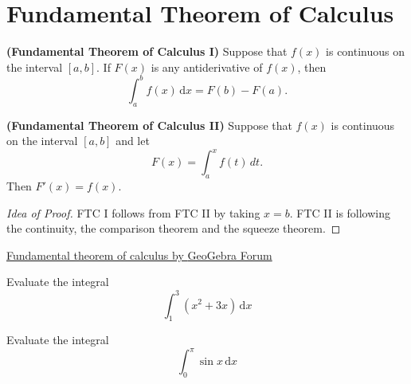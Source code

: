 
\hypertarget{fundamental-theorem-of-calculus}{%
\section{Fundamental Theorem of
Calculus}\label{fundamental-theorem-of-calculus}}

\begin{theorem}

\textbf{(Fundamental Theorem of Calculus I)} Suppose that \(f(x)\) is
continuous on the interval \([a,b]\). If \(F(x)\) is any antiderivative
of \(f(x)\), then \[\int_a^b f(x)\,\mathrm{d}x = F(b)-F(a).\]

\end{theorem}

\begin{theorem}

\textbf{(Fundamental Theorem of Calculus II)} Suppose that \(f(x)\) is
continuous on the interval \([a,b]\) and let \[F(x)=\int_a^x f(t)\,dt.\]
Then \(F'(x)=f(x)\).

\end{theorem}

\begin{proof}[Idea of Proof] FTC I follows from FTC II by taking \(x=b\). FTC
II is following the continuity, the comparison theorem and the squeeze
theorem.
\end{proof}

\href{https://www.geogebra.org/m/wdUED3wy}{Fundamental theorem of calculus by \href{https://www.geogebra.org/u/geogebra+forum}{GeoGebra Forum}}



\begin{example}

Evaluate the integral \[ \int_1^3 (x^2+3x)\,\mathrm{d}x\]

\end{example}
\vspace*{6\baselineskip}

\begin{example}

Evaluate the integral \[ \int_0^\pi \sin x \,\mathrm{d}x\]

\end{example}
\vspace*{6\baselineskip}

